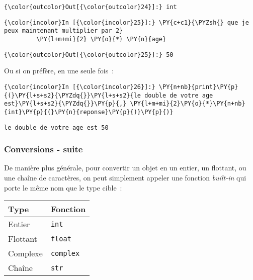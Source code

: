 \begin{Verbatim}[commandchars=\\\{\}]
{\color{outcolor}Out[{\color{outcolor}24}]:} int
\end{Verbatim}
            
    \begin{Verbatim}[commandchars=\\\{\}]
{\color{incolor}In [{\color{incolor}25}]:} \PY{c+c1}{\PYZsh{} que je peux maintenant multiplier par 2}
         \PY{l+m+mi}{2} \PY{o}{*} \PY{n}{age}
\end{Verbatim}


\begin{Verbatim}[commandchars=\\\{\}]
{\color{outcolor}Out[{\color{outcolor}25}]:} 50
\end{Verbatim}
            
    Ou si on préfère, en une seule fois~:

    \begin{Verbatim}[commandchars=\\\{\}]
{\color{incolor}In [{\color{incolor}26}]:} \PY{n+nb}{print}\PY{p}{(}\PY{l+s+s2}{\PYZdq{}}\PY{l+s+s2}{le double de votre age est}\PY{l+s+s2}{\PYZdq{}}\PY{p}{,} \PY{l+m+mi}{2}\PY{o}{*}\PY{n+nb}{int}\PY{p}{(}\PY{n}{reponse}\PY{p}{)}\PY{p}{)}
\end{Verbatim}


    \begin{Verbatim}[commandchars=\\\{\}]
le double de votre age est 50

    \end{Verbatim}

    \hypertarget{conversions---suite}{%
\subsubsection{Conversions - suite}\label{conversions---suite}}

    De manière plus générale, pour convertir un objet en un entier, un
flottant, ou une chaîne de caractères, on peut simplement appeler une
fonction \emph{built-in} qui porte le même nom que le type cible~:

\begin{longtable}[]{@{}ll@{}}
\toprule
Type & Fonction\tabularnewline
\midrule
\endhead
Entier & \texttt{int}\tabularnewline
Flottant & \texttt{float}\tabularnewline
Complexe & \texttt{complex}\tabularnewline
Chaîne & \texttt{str}\tabularnewline
\bottomrule
\end{longtable}

